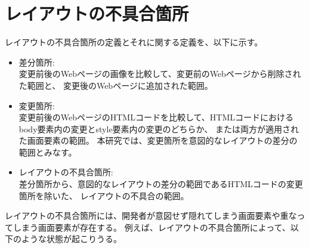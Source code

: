 \section{レイアウトの不具合箇所}\label{sec:layout effect}
レイアウトの不具合箇所の定義とそれに関する定義を、以下に示す。
\begin{itemize}
      \item 差分箇所:\\
            変更前後のWebページの画像を比較して、変更前のWebページから削除された範囲と、
            変更後のWebページに追加された範囲。
      \item 変更箇所:\\
            変更前後のWebページのHTMLコードを比較して、HTMLコードにおけるbody要素内の変更とstyle要素内の変更のどちらか、
            または両方が適用された画面要素の範囲。
            本研究では、変更箇所を意図的なレイアウトの差分の範囲とみなす。
      \item レイアウトの不具合箇所:\\
            差分箇所から、意図的なレイアウトの差分の範囲であるHTMLコードの変更箇所を除いた、
            レイアウトの不具合の範囲。
\end{itemize}
\par
レイアウトの不具合箇所には、開発者が意図せず隠れてしまう画面要素や重なってしまう画面要素が存在する。
例えば、レイアウトの不具合箇所によって、以下のような状態が起こりうる。
